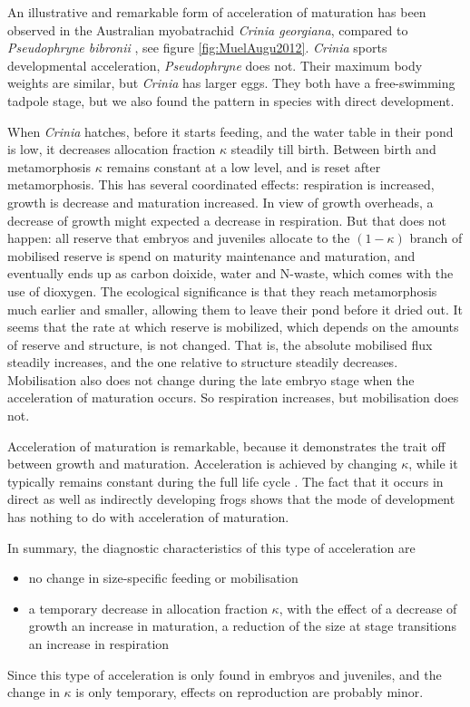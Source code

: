 An illustrative and remarkable form of acceleration of maturation has been observed in the Australian myobatrachid \emph{Crinia georgiana}, compared to \emph{Pseudophryne bibronii} \cite{MuelAugu2012}, see figure \ref{fig:MuelAugu2012}. 
\emph{Crinia} sports developmental acceleration, \emph{Pseudophryne} does not.
Their maximum body weights are similar, but \emph{Crinia} has larger eggs.
They both have a free-swimming tadpole stage, but we also found the pattern in species with direct development.

When \emph{Crinia} hatches, before it starts feeding, and the water table in their pond is low, it decreases allocation fraction $\kappa$ steadily till birth.
Between birth and metamorphosis $\kappa$ remains constant at a low level, and is reset after metamorphosis.
This has several coordinated effects:
respiration is increased, growth is decrease and maturation increased.
In view of growth overheads, a decrease of growth might expected a decrease in respiration.
But that does not happen: all reserve that embryos and juveniles allocate to the $(1 - \kappa)$ branch of mobilised reserve is spend on maturity maintenance and maturation, and eventually ends up as carbon doixide, water and N-waste, which comes with the use of dioxygen.
The ecological significance is that they reach metamorphosis much earlier and smaller, allowing them to leave their pond before it dried out.
It seems that the rate at which reserve is mobilized, which depends on the amounts of reserve and structure, is not changed.
That is, the absolute mobilised flux steadily increases, and the one relative to structure steadily decreases.
Mobilisation also does not change during the late embryo stage when the acceleration of maturation occurs.
So respiration increases, but mobilisation does not.

Acceleration of maturation is remarkable, because it demonstrates the trait off between growth and maturation.
Acceleration is achieved by changing $\kappa$, while it typically remains constant during the full life cycle \cite{LikaKooy2011}.
The fact that it occurs in direct as well as indirectly developing frogs shows that the mode of development has nothing to do with acceleration of maturation.

In summary, the diagnostic characteristics of this type of acceleration are
\begin{itemize}
  \item no change in size-specific feeding or mobilisation
	\item a temporary decrease in allocation fraction $\kappa$, with the effect of 
	  \subitem a decrease of growth
		\subitem an increase in maturation, 
		\subitem a reduction of the size at stage transitions
		\subitem an increase in respiration
\end{itemize}
Since this type of acceleration is only found in embryos and juveniles, and the change in $\kappa$ is only temporary, effects on reproduction are probably minor. 

